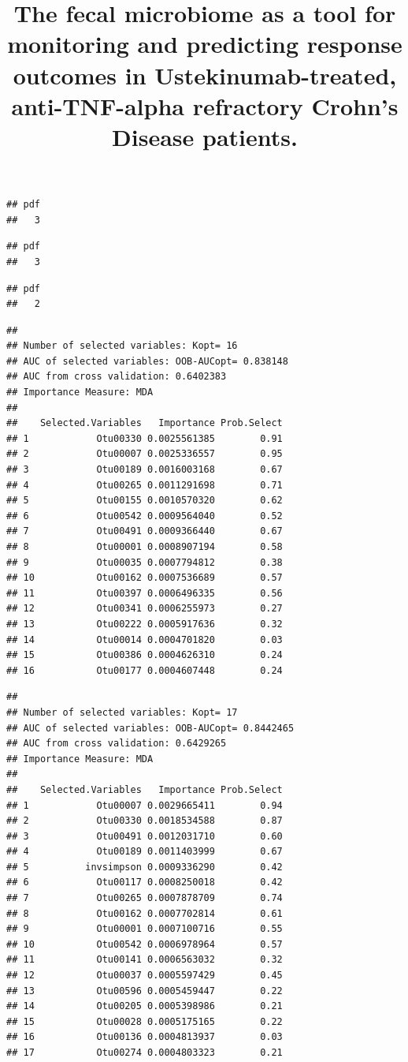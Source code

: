 \documentclass[11pt,]{article}
\title{The fecal microbiome as a tool for monitoring and predicting response
outcomes in Ustekinumab-treated, anti-TNF-alpha refractory Crohn's
Disease patients.}
\author{}
\date{}
\begin{document}
\maketitle

\begin{verbatim}
## pdf 
##   3
\end{verbatim}

\begin{verbatim}
## pdf 
##   3
\end{verbatim}

\begin{verbatim}
## pdf 
##   2
\end{verbatim}

\begin{verbatim}
## 
## Number of selected variables: Kopt= 16 
## AUC of selected variables: OOB-AUCopt= 0.838148 
## AUC from cross validation: 0.6402383 
## Importance Measure: MDA 
## 
##    Selected.Variables   Importance Prob.Select
## 1            Otu00330 0.0025561385        0.91
## 2            Otu00007 0.0025336557        0.95
## 3            Otu00189 0.0016003168        0.67
## 4            Otu00265 0.0011291698        0.71
## 5            Otu00155 0.0010570320        0.62
## 6            Otu00542 0.0009564040        0.52
## 7            Otu00491 0.0009366440        0.67
## 8            Otu00001 0.0008907194        0.58
## 9            Otu00035 0.0007794812        0.38
## 10           Otu00162 0.0007536689        0.57
## 11           Otu00397 0.0006496335        0.56
## 12           Otu00341 0.0006255973        0.27
## 13           Otu00222 0.0005917636        0.32
## 14           Otu00014 0.0004701820        0.03
## 15           Otu00386 0.0004626310        0.24
## 16           Otu00177 0.0004607448        0.24
\end{verbatim}

\begin{verbatim}
## 
## Number of selected variables: Kopt= 17 
## AUC of selected variables: OOB-AUCopt= 0.8442465 
## AUC from cross validation: 0.6429265 
## Importance Measure: MDA 
## 
##    Selected.Variables   Importance Prob.Select
## 1            Otu00007 0.0029665411        0.94
## 2            Otu00330 0.0018534588        0.87
## 3            Otu00491 0.0012031710        0.60
## 4            Otu00189 0.0011403999        0.67
## 5          invsimpson 0.0009336290        0.42
## 6            Otu00117 0.0008250018        0.42
## 7            Otu00265 0.0007878709        0.74
## 8            Otu00162 0.0007702814        0.61
## 9            Otu00001 0.0007100716        0.55
## 10           Otu00542 0.0006978964        0.57
## 11           Otu00141 0.0006563032        0.32
## 12           Otu00037 0.0005597429        0.45
## 13           Otu00596 0.0005459447        0.22
## 14           Otu00205 0.0005398986        0.21
## 15           Otu00028 0.0005175165        0.22
## 16           Otu00136 0.0004813937        0.03
## 17           Otu00274 0.0004803323        0.21
\end{verbatim}
\end{document}

